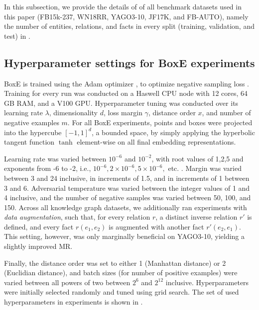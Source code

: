 \documentclass{article}
\begin{document}
In this subsection, we provide the details of of all benchmark datasets used in this paper (FB15k-237, WN18RR, YAGO3-10, JF17K, and FB-AUTO), namely the number of entities, relations, and facts in every split (training, validation, and test) in .  

\subsection{Hyperparameter settings for BoxE experiments}
BoxE is trained using the Adam optimizer \cite{Kingma-ICLR2014}, to optimize negative sampling loss \cite{RotatE-ICLR19}. Training for every run was conducted on a Haswell CPU node with 12 cores, 64 GB RAM, and a V100 GPU. Hyperparameter tuning was conducted over its learning rate $\lambda$, dimensionality $d$, loss margin $\gamma$, distance order $x$, and number of negative examples $m$. For all BoxE experiments, points and boxes were projected into the hypercube $[-1,1]^d$, a bounded space, by simply applying the hyperbolic tangent function $\tanh$ element-wise on all final embedding representations. 

Learning rate was varied between $10^{-6}$ and $10^{-2}$, with root values of 1,2,5 and exponents from -6 to -2, i.e., $10^{-6}, 2\times10^{-6}, 5\times10^{-6},$ etc. .
Margin was varied between 3 and 24 inclusive, in increments of 1.5, and in increments of 1 between 3 and 6. Adversarial temperature was varied between the integer values of 1 and 4 inclusive, and the number of negative samples was varied between 50, 100, and 150. 
Across all knowledge graph datasets, we additionally ran experiments with \emph{data augmentation}, such that, for every relation $r$, a distinct inverse relation $r'$ is defined, and every fact $r(e_1, e_2)$ is augmented with another fact $r'(e_2,e_1)$. This setting, however, was only marginally beneficial on YAGO3-10, yielding a slightly improved MR. 

Finally, the distance order was set to either 1 (Manhattan distance) or 2 (Euclidian distance), and batch sizes (for number of positive examples) were varied between all powers of two between $2^6$ and $2^{12}$ inclusive. Hyperparameters were initially selected randomly and tuned using grid search. The set of used hyperparameters in experiments is shown in . 
\end{document}
